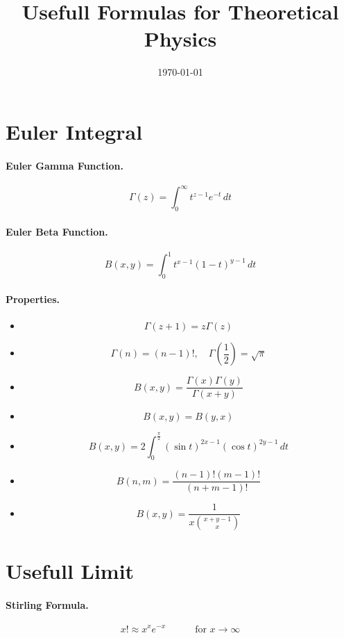 \documentclass{article}
\begin{document}
\title{Usefull Formulas for Theoretical Physics}
\date{\today}
\maketitle


\section{Euler Integral}
\paragraph{Euler Gamma Function.}
\[
\Gamma(z) = \int_{0}^{\infty} t^{z-1} e^{-t} \, dt
\]
\paragraph{Euler Beta Function.}
\[
B(x, y) = \int_{0}^{1} t^{x-1} (1-t)^{y-1} \, dt
\]
\paragraph{Properties.}
\begin{itemize}
    \item 
    \[
    \Gamma(z+1) = z \Gamma(z)
    \]
    \item 
    \[
    \Gamma(n) = (n-1)!, \quad \Gamma\left(\frac{1}{2}\right) = \sqrt{\pi}
    \]
    \item 
    \[
    B(x, y) = \frac{\Gamma(x)\Gamma(y)}{\Gamma(x+y)}
    \]
    \item 
    \[
    B(x, y) = B(y, x)
    \]
    \item
    \[
    B(x, y) = 2 \int_{0}^{\frac{\pi}{2}} (\sin t)^{2x-1} (\cos t)^{2y-1} \, dt
    \]
    \item
    \[
    B(n, m) = \frac{(n-1)!(m-1)!}{(n+m-1)!}
    \]
    \item 
    \[
    B(x, y) = \frac{1}{x \binom{x+y-1}{x}}
    \]
\end{itemize}

\section{Usefull Limit}
\paragraph{Stirling Formula.}
\[
x! \approx x^{x} e^{-x} \quad\quad\quad \text{for } x \longrightarrow \infty 
\]
\end{document}

